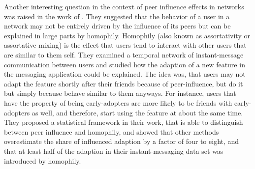 Another interesting question in the context of peer influence effects in networks was raised in the work of \citet{Aral2009}.
They suggested that the behavior of a user in a network may not be entirely driven by the influence of its peers but can be explained in large parts by homophily.
Homophily (also known as assortativity or assortative mixing) is the effect that users tend to interact with other users that are similar to them self.
They examined a temporal network of instant-message communication between users and studied how the adaption of a new feature in the messaging application could be explained.
The idea was, that users may not adapt the feature shortly after their friends because of peer-influence, but do it but simply because behave similar to them anyways.
For instance, users that have the property of being early-adopters are more likely to be friends with early-adopters as well, and therefore, start using the feature at about the same time.
They proposed a statistical framework in their work, that is able to distinguish between peer influence and homophily, and showed that other methods overestimate the share of influenced adaption by a factor of four to eight, and that at least half of the adaption in their instant-messaging data set was introduced by homophily.
